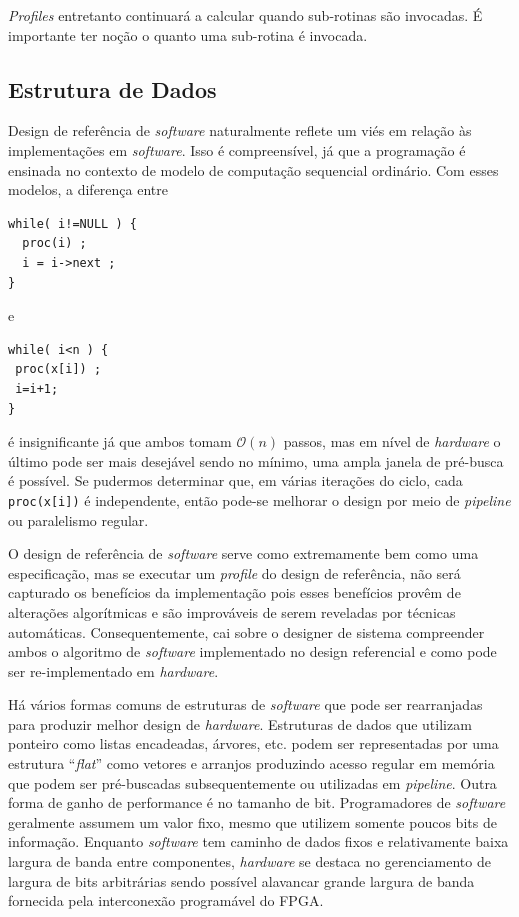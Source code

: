 \textit{Profiles} entretanto continuará a calcular quando sub-rotinas são invocadas. É importante ter noção o quanto uma sub-rotina é invocada.



\subsection{Estrutura de Dados}

Design de referência de \textit{software} naturalmente reflete um viés em relação às implementações em \textit{software}. Isso é compreensível, já que a programação é ensinada no contexto de modelo de computação sequencial ordinário. Com esses modelos, a diferença entre 

\begin{verbatim}
while( i!=NULL ) {
  proc(i) ;
  i = i->next ;
} 
\end{verbatim}
e 
\begin{verbatim}
while( i<n ) {
 proc(x[i]) ;
 i=i+1;
}
\end{verbatim}

é insignificante já que ambos tomam $ \mathcal{O}(n) $ passos, mas em nível de \textit{hardware} o último pode ser mais desejável sendo no mínimo, uma ampla janela de pré-busca é possível. Se pudermos determinar que, em várias iterações do ciclo, cada \texttt{proc(x[i])} é independente, então pode-se melhorar o design por meio de \textit{pipeline} ou paralelismo regular.

O design de referência de \textit{software} serve como extremamente bem como uma especificação, mas se executar um \textit{profile} do design de referência, não será capturado os benefícios da implementação pois esses benefícios provêm de alterações algorítmicas e são improváveis de serem reveladas por técnicas automáticas. Consequentemente, cai sobre o designer de sistema compreender ambos o algoritmo de \textit{software} implementado no design referencial e como pode ser re-implementado em \textit{hardware}.

Há vários formas comuns de estruturas de \textit{software} que pode ser rearranjadas para produzir melhor design de \textit{hardware}. Estruturas de dados que utilizam ponteiro como listas encadeadas, árvores, etc. podem ser representadas por uma estrutura ``\textit{flat}'' como vetores e arranjos produzindo acesso regular em memória que podem ser pré-buscadas subsequentemente ou utilizadas em \textit{pipeline}. Outra forma de ganho de performance é no tamanho de bit. Programadores de \textit{software} geralmente assumem um valor fixo, mesmo que utilizem somente poucos bits de informação. Enquanto \textit{software} tem caminho de dados fixos e relativamente baixa largura de banda entre componentes, \textit{hardware} se destaca no gerenciamento de largura de bits arbitrárias sendo possível alavancar grande largura de banda fornecida pela interconexão programável do FPGA.



